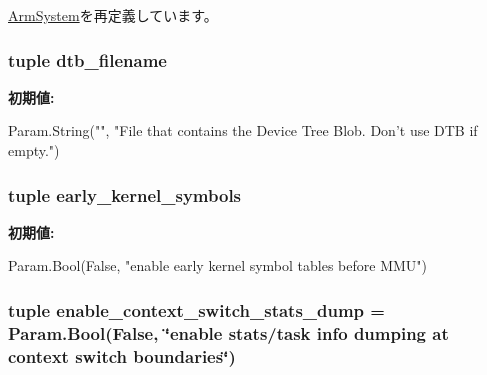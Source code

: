 \hyperlink{classArmSystem_1_1ArmSystem_a17da7064bc5c518791f0c891eff05fda}{ArmSystem}を再定義しています。\hypertarget{classArmSystem_1_1LinuxArmSystem_ab0f96c7f19a38e7fa5b4806fed0078ac}{
\subsubsection[{dtb\_\-filename}]{\setlength{\rightskip}{0pt plus 5cm}tuple dtb\_\-filename}}
\label{classArmSystem_1_1LinuxArmSystem_ab0f96c7f19a38e7fa5b4806fed0078ac}
{\bfseries 初期値:}
\begin{DoxyCode}
Param.String("",
        "File that contains the Device Tree Blob. Don't use DTB if empty.")
\end{DoxyCode}
\hypertarget{classArmSystem_1_1LinuxArmSystem_ad2b37df25c6d2bb66de60dd18f5696b6}{
\subsubsection[{early\_\-kernel\_\-symbols}]{\setlength{\rightskip}{0pt plus 5cm}tuple early\_\-kernel\_\-symbols}}
\label{classArmSystem_1_1LinuxArmSystem_ad2b37df25c6d2bb66de60dd18f5696b6}
{\bfseries 初期値:}
\begin{DoxyCode}
Param.Bool(False,
        "enable early kernel symbol tables before MMU")
\end{DoxyCode}
\hypertarget{classArmSystem_1_1LinuxArmSystem_ac718c043f724948b038fc16de7f90860}{
\subsubsection[{enable\_\-context\_\-switch\_\-stats\_\-dump}]{\setlength{\rightskip}{0pt plus 5cm}tuple enable\_\-context\_\-switch\_\-stats\_\-dump = Param.Bool(False, \char`\"{}enable stats/task info dumping at context switch boundaries\char`\"{})}}
